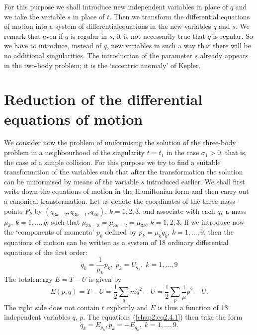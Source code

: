 For this purpose we shall introduce new independent variables in place of $q$ and we take the variable $s$ in place of $t$. Then we transform the differential equations of motion into a system of differential\pageoriginale equations in the new variables $q$ and $s$. We remark that even if $q$ is regular in $s$, it is not necessarily true that $\dot{q}$ is regular. So we have to introduce, instead of $\dot{q}$, new variables in such a way that there will be no additional singularities. The introduction of the parameter $s$ already appears in the two-body problem; it is the `eccentric anomaly' of Kepler.

\section{Reduction of the differential equations of motion}\label{chap2:sec4}
We consider now the problem of uniformising the solution of the three-body problem in a neighbourhood of the singularity $t = t_1$ in the case $\sigma_1 > 0$, that is, the case of a simple collision. For this purpose we try to find a suitable transformation of the variables such that after the transformation the solution can be uniformised by means of the variable $s$ introduced earlier. We shall first write down the equations of motion in the Hamiltonian form and then carry out a canonical transformation. Let us denote the coordinates of the three mass-points $P_k$ by $(q_{3k-2}, q_{3k-1}, q_{3k})$, $k =1, 2,3$, and associate with each $q_k$ a mass $\mu_k$, $k = 1,\ldots, q$, such that $\mu_{3k-3} = \mu_{3k - 2} = \mu_{3k}$, $k = 1,2,3$. If we introduce now the `components of momenta'  $p_k$ defined by $p_k = \mu_k \dot{q}_k$, $k=1, \ldots, 9$, then the equations of motion can be written as a system of 18 ordinary differential equations of the first order:
\begin{equation*}
\dot{q}_k = \frac{1}{\mu_k} p_k, \; \dot{p}_k = U_{q_k}, \; k =1 , \ldots, 9\tag{2.4.1}\label{chap2:eq2.4.1} 
\end{equation*}
The total\pageoriginale energy $E = T - U$ is given by
$$
E(p,q)= T - U = \frac{1}{2} \sum\limits_q m \dot{q}^2 - U = \frac{1}{2} \sum\limits_p \frac{1}{\mu} p^2 - U.
$$
The right side does not contain $t$ explicitly and $E$ is thus a function of 18 independent variables $q$, $p$. The equations (\ref{chap2:eq2.4.1}) then take the form
\begin{equation*}
\dot{q}_k = E_{p_k}, \dot{p}_k = - E_{q_k}, \; k = 1, \ldots, 9.\tag{2.4.2}\label{chap2:eq2.4.2} 
\end{equation*}
